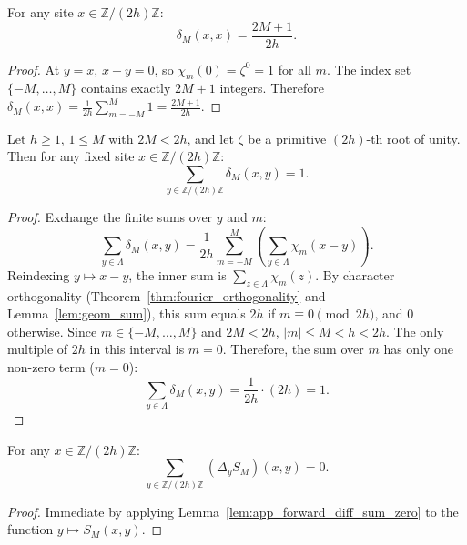 \begin{lemma}
\label{lem:app_dirichlet_diagonal}
For any site $x \in \mathbb{Z}/(2h)\mathbb{Z}$:
\begin{equation}
\delta_M(x, x) = \frac{2M + 1}{2h}.
\end{equation}
\end{lemma}

\begin{proof}
At $y = x$, $x - y = 0$, so $\chi_m(0) = \zeta^0 = 1$ for all $m$. The index set $\{-M, \dots, M\}$ contains exactly $2M + 1$ integers. Therefore $\delta_M(x, x) = \frac{1}{2h} \sum_{m=-M}^M 1 = \frac{2M+1}{2h}$.
\end{proof}

\begin{lemma}
\label{lem:app_dirichlet_spatial_sum}
Let $h \ge 1$, $1 \le M$ with $2M < 2h$, and let $\zeta$ be a primitive $(2h)$-th root of unity. Then for any fixed site $x \in \mathbb{Z}/(2h)\mathbb{Z}$:
\begin{equation}
\sum_{y \in \mathbb{Z}/(2h)\mathbb{Z}} \delta_M(x, y) = 1.
\end{equation}
\end{lemma}

\begin{proof}
Exchange the finite sums over $y$ and $m$:
\[
\sum_{y \in \Lambda} \delta_M(x, y) = \frac{1}{2h} \sum_{m = -M}^M \left( \sum_{y \in \Lambda} \chi_m(x - y) \right).
\]
Reindexing $y \mapsto x - y$, the inner sum is $\sum_{z \in \Lambda} \chi_m(z)$. By character orthogonality (Theorem~\ref{thm:fourier_orthogonality} and Lemma~\ref{lem:geom_sum}), this sum equals $2h$ if $m \equiv 0 \pmod{2h}$, and $0$ otherwise.
Since $m \in \{-M, \dots, M\}$ and $2M < 2h$, $|m| \le M < h < 2h$. The only multiple of $2h$ in this interval is $m = 0$. Therefore, the sum over $m$ has only one non-zero term ($m = 0$):
\[
\sum_{y \in \Lambda} \delta_M(x, y) = \frac{1}{2h} \cdot (2h) = 1.
\]
\end{proof}

\begin{lemma}
\label{lem:app_skew_kernel_diff_sum_zero}
For any $x \in \mathbb{Z}/(2h)\mathbb{Z}$:
\begin{equation}
\sum_{y \in \mathbb{Z}/(2h)\mathbb{Z}} (\Delta_y S_M)(x, y) = 0.
\end{equation}
\end{lemma}

\begin{proof}
Immediate by applying Lemma~\ref{lem:app_forward_diff_sum_zero} to the function $y \mapsto S_M(x, y)$.
\end{proof}

